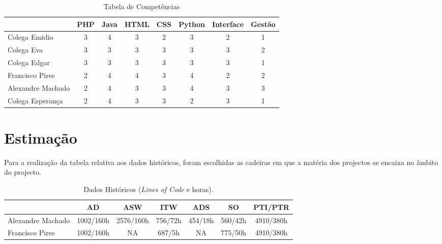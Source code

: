 \documentclass[12pt, a4paper, twoside]{report} %
\begin{document}
\begin{table}[h]
\centering
\begin{tabular}{|l|c c c c c c c|}
\hline
                  & PHP & Java & HTML & CSS & Python & Interface & Gestão   \\ \hline
Colega Emidio     & 3   & 4    & 3    & 2   & 3      & 2         & 1        \\ \hline
Colega Eva        & 3   & 3    & 3    & 3   & 3      & 3         & 2        \\ \hline
Colega Edgar      & 3   & 3    & 3    & 3   & 3      & 3         & 1        \\ \hline
Francisco Pires   & 2   & 4    & 4    & 3   & 4      & 2         & 2        \\ \hline
Alexandre Machado & 2   & 4    & 3    & 3   & 4      & 3         & 3        \\ \hline
Colega Esperança  & 2   & 4    & 3    & 3   & 2      & 3         & 1        \\ \hline
\end{tabular}
\caption{Tabela de Competências}
\label{competencias}
\end{table}

\clearpage


\section{Estimação}

Para a realização da tabela relativa aos dados históricos, foram escolhidas as cadeiras em que a matéria dos projectos se encaixa no âmbito do projecto.

\begin{table}[h]
\centering
\begin{tabular}{|l|c c c c c c|}
\hline
                  & AD        & ASW       & ITW     & ADS     & SO     & PTI/PTR \\ \hline
Alexandre Machado & 1002/160h & 2576/160h & 756/72h & 454/18h & 560/42h  & 4910/380h\\ \hline
Francisco Pires   & 1002/160h & NA        & 687/5h  & NA      & 775/50h  & 4910/380h \\ \hline
\end{tabular}
\caption{ Dados Históricos (\textit{Lines of Code} e horas).}
\label{my-label}
\end{table}
\end{document}
